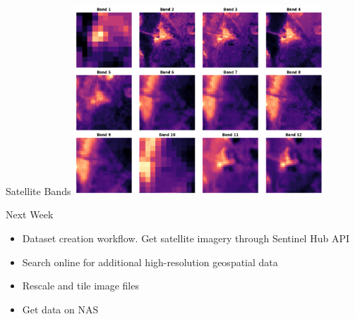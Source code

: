 \begin{frame}{Satellite Bands}
  \centering
  \includegraphics[height=0.7\textheight,width=0.7\textwidth,keepaspectratio]{images/satellite-bands.png}
\end{frame}

\begin{frame}{Next Week}
  \begin{itemize}
      \item Dataset creation workflow. Get satellite imagery through Sentinel Hub API
      \item Search online for additional high-resolution geospatial data
      \item Rescale and tile image files
      \item Get data on NAS
  \end{itemize}
\end{frame}

